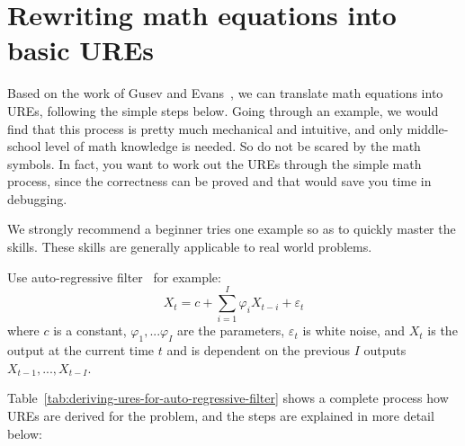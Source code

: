 \chapter{Rewriting math equations into basic UREs}

Based on the work of Gusev and Evans~\cite{broadcastElim,broadcastElimQR},  we can translate math equations into UREs, following the simple steps below. Going through an example, we would find that this process is pretty much mechanical and intuitive, and only middle-school level of math knowledge is needed. So do not be scared by the math symbols. In fact, you want to work out the UREs through the simple math process, since the correctness can be proved and that would save you time in debugging.

We strongly recommend a beginner tries one example so as to quickly master the skills. These skills are generally applicable to real world problems.

Use auto-regressive filter~\cite{autoRegressiveModel} for example:
\begin{equation}
 X_t=c+\sum\limits^I_{i=1}\varphi_i X_{t-i}+\varepsilon_t
\end{equation}
where $c$ is a constant, $\varphi_1, ... \varphi_I$ are the parameters, $\varepsilon _t$ is white noise, and $X_t$ is the output at the current time $t$ and is dependent on the previous $I$ outputs $ X_{t-1}, ..., X_{t-I}$. 

Table~\ref{tab:deriving-ures-for-auto-regressive-filter} shows a complete process how UREs are derived for the problem, and the steps are explained in more detail below:

